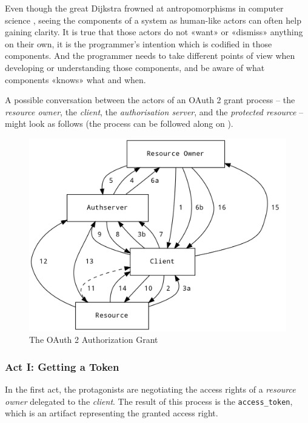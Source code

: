Even though the great Dijkstra frowned at antropomorphisms in computer science \cite{EWD936}, seeing the components of a system as human-like actors can often help gaining clarity. It is true that those actors do not «want» or «dismiss» anything on their own, it is the programmer's intention which is codified in those components. And the programmer needs to take different points of view when developing or understanding those components, and be aware of what components «knows» what and when.

A possible conversation between the actors of an OAuth 2 grant process -- the \textit{resource owner}, the \textit{client}, the \textit{authorisation server}, and the \textit{protected resource} -- might look as follows (the process can be followed along on ).

\begin{figure}
    \centering
    \includegraphics[width=\linewidth]{auth-grant.png}
    \caption{The OAuth 2 Authorization Grant}
    \label{fig:auth-grant}
\end{figure}

\subsubsection{Act I: Getting a Token}

In the first act, the protagonists are negotiating the access rights of a \textit{resource owner} delegated to the \textit{client}. The result of this process is the \texttt{access\_token}, which is an artifact representing the granted access right.

